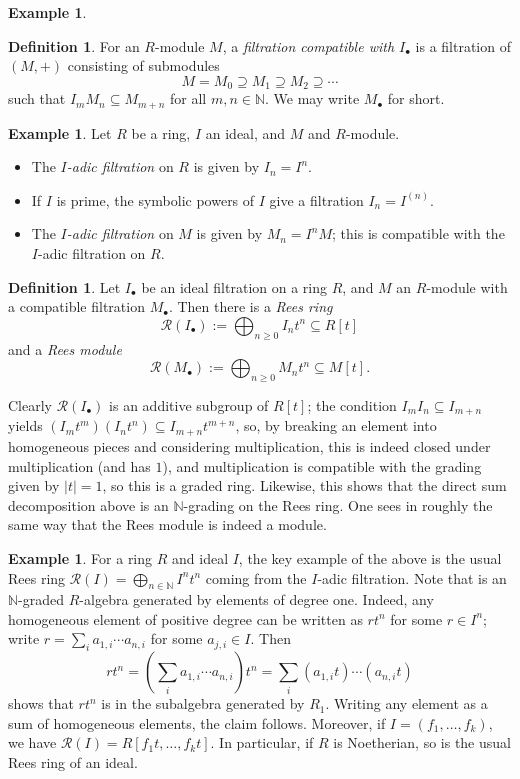 \documentclass{amsart}[12pt]
\newcommand{\N}{\mathbb{N}}
\newcommand{\NN}{\mathbb{N}}
\newcommand{\DEF}[1]{\emph{#1}\index{#1}}
\numberwithin{equation}{section}
\theoremstyle{plain} %
\theoremstyle{definition}
\newtheorem{definition}[equation]{Definition}
\newtheorem{ex}[equation]{Example}
\newtheorem{example}[equation]{Example}
\theoremstyle{remark}
\begin{document}
\begin{ex}
\begin{definition}
	For an $R$-module $M$, a \emph{filtration compatible with $I_{\bullet}$} is a filtration of $(M,+)$ consisting of submodules
	\[ M =M_0 \supseteq M_1 \supseteq M_2 \supseteq \cdots \]
	such that $I_m M_n \subseteq M_{m+n}$ for all $m,n\in \NN$. 
We may write $M_\bullet$ for short.
\end{definition}

\begin{ex} Let $R$ be a ring, $I$ an ideal, and $M$ and $R$-module.
\begin{itemize} \item The \DEF{$I$-adic filtration} on $R$ is given by $I_n = I^n$.
\item If $I$ is prime, the symbolic powers of $I$ give a filtration $I_n = I^{(n)}$.
\item The \emph{$I$-adic filtration} on $M$ is given by $M_n = I^n M$; this is compatible with the $I$-adic filtration on $R$.
\end{itemize}
\end{ex}


\begin{definition}
	Let $I_{\bullet}$ be an ideal filtration on a ring $R$, and $M$ an $R$-module with a compatible filtration $M_{\bullet}$. Then there is a \emph{Rees ring}
	\[ \mathcal{R}(I_{\bullet}) := \bigoplus_{n \geq 0} I_n t^n \subseteq R[t]\]
		and a \emph{Rees module}
	 	\[ \mathcal{R}(M_{\bullet}) := \bigoplus_{n\geq 0} M_n t^n \subseteq M[t].\]
\end{definition}

Clearly $\mathcal{R}(I_{\bullet})$ is an additive subgroup of $R[t]$; the condition $I_m I_n\subseteq I_{m+n}$ yields $(I_m t^m) (I_n t^n) \subseteq I_{m+n} t^{m+n}$, so, by breaking an element into homogeneous pieces and considering multiplication, this is indeed closed under multiplication (and has $1$), and multiplication is compatible with the grading given by $|t|=1$, so this is a graded ring. Likewise, this shows that the direct sum decomposition above is an $\NN$-grading on the Rees ring. One sees in roughly the same way that the Rees module is indeed a module.

\begin{example} For a ring $R$ and ideal $I$, the key example of the above is the usual Rees ring $\mathcal{R}(I)= \bigoplus_{n\in \N} I^n t^n$ coming from the $I$-adic filtration. Note that is an $\NN$-graded $R$-algebra generated by elements of degree one. Indeed, any homogeneous element of positive degree can be written as $r t^n$ for some $r\in I^n$; write $r=\sum_i a_{1,i} \cdots a_{n,i}$ for some $a_{j,i}\in I$. Then 
\[ r t^n = \left( \sum_i a_{1,i} \cdots a_{n,i} \right) t^n = \sum_i (a_{1,i} t) \cdots (a_{n,i} t) \]
shows that $r t^n$ is in the subalgebra generated by $R_1$. Writing any element as a sum of homogeneous elements, the claim follows. Moreover, if $I=(f_1,\dots,f_k)$, we have $\mathcal{R}(I) = R[f_1 t,\dots,f_k t]$. In particular, if $R$ is Noetherian, so is the usual Rees ring of an ideal.
 \end{example}



\end{ex}
\end{document}

